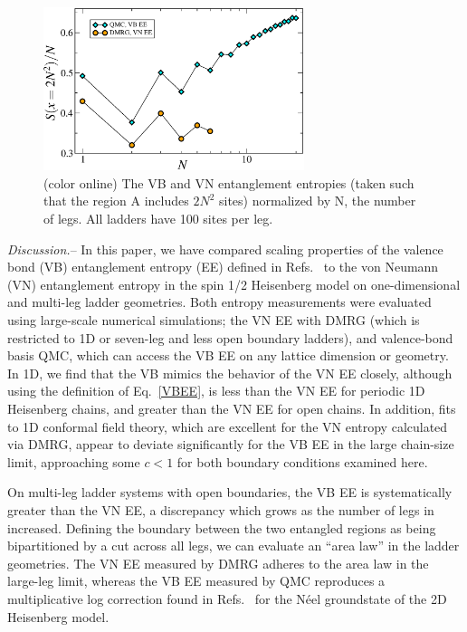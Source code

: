 \documentclass[prl,aps,twocolumn,floatfix,amsmath,amssymb,superscriptaddress,tightenlines]{revtex4}
\begin{document}
\begin{figure}
{
\includegraphics[width=3in]{fig4.eps}
\caption{(color online) The VB and VN entanglement entropies (taken such that the region A includes $2N^2$ sites) normalized by N, the number of legs.  All ladders have 100 sites per leg.
\label{zigzag}}}
\end{figure}

{\it Discussion.}-- In this paper, we have compared scaling properties of the valence bond (VB) entanglement entropy (EE) defined in Refs.~\cite{Alet,Chh} to the von Neumann (VN) entanglement entropy in the spin 1/2 Heisenberg model on one-dimensional and multi-leg ladder geometries.  Both entropy measurements were evaluated using large-scale numerical simulations; the VN EE with DMRG (which is restricted to 1D or seven-leg and less open boundary ladders), and valence-bond basis QMC, which can access the VB EE on any lattice dimension or geometry.  In 1D, we find that the VB mimics the behavior of the VN EE closely, although using the definition of Eq.~\eqref{VBEE}, is less than the VN EE for periodic 1D Heisenberg chains, and greater than the VN EE for open chains.  In addition, fits to 1D conformal field theory, which are excellent for the VN entropy calculated via DMRG, appear to deviate significantly for the VB EE in the large chain-size limit, approaching some $c<1$ for both boundary conditions examined here.

On multi-leg ladder systems with open boundaries, the VB EE is systematically greater than the VN EE, a discrepancy which grows as the number of legs in increased.  Defining the boundary between the two entangled regions as being bipartitioned by a cut across all legs, we can evaluate an ``area law'' in the ladder geometries.  The VN EE measured by DMRG adheres to the area law in the large-leg limit, whereas the VB EE measured by QMC reproduces a multiplicative log correction found in Refs.~\cite{Alet,Chh} for the N\'eel groundstate of the 2D Heisenberg model.
\end{document}
